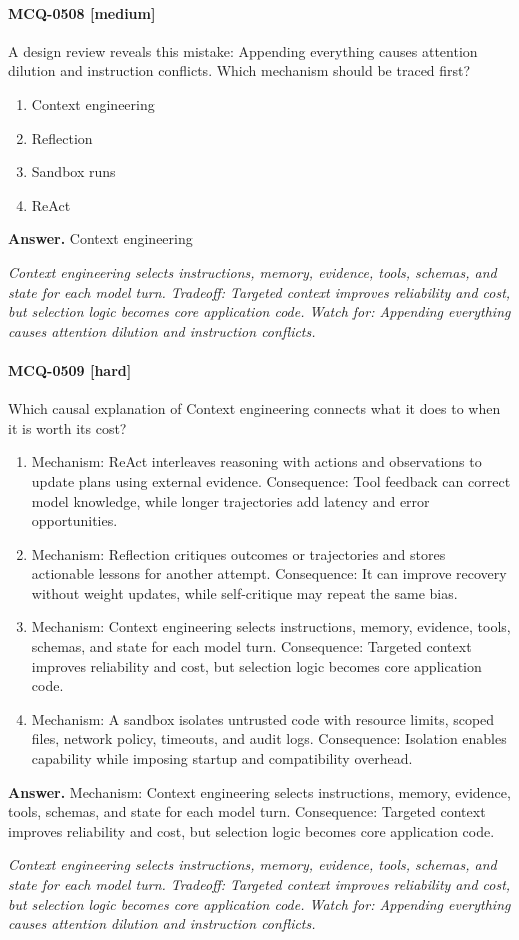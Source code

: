 \paragraph{MCQ-0508 [medium]} A design review reveals this mistake: Appending everything causes attention dilution and instruction conflicts. Which mechanism should be traced first?
\begin{enumerate}[label=\Alph*.]
\item Context engineering
\item Reflection
\item Sandbox runs
\item ReAct
\end{enumerate}
\noindent\textbf{Answer.} Context engineering
\par\textit{Context engineering selects instructions, memory, evidence, tools, schemas, and state for each model turn. Tradeoff: Targeted context improves reliability and cost, but selection logic becomes core application code. Watch for: Appending everything causes attention dilution and instruction conflicts.}
\paragraph{MCQ-0509 [hard]} Which causal explanation of Context engineering connects what it does to when it is worth its cost?
\begin{enumerate}[label=\Alph*.]
\item Mechanism: ReAct interleaves reasoning with actions and observations to update plans using external evidence. Consequence: Tool feedback can correct model knowledge, while longer trajectories add latency and error opportunities.
\item Mechanism: Reflection critiques outcomes or trajectories and stores actionable lessons for another attempt. Consequence: It can improve recovery without weight updates, while self-critique may repeat the same bias.
\item Mechanism: Context engineering selects instructions, memory, evidence, tools, schemas, and state for each model turn. Consequence: Targeted context improves reliability and cost, but selection logic becomes core application code.
\item Mechanism: A sandbox isolates untrusted code with resource limits, scoped files, network policy, timeouts, and audit logs. Consequence: Isolation enables capability while imposing startup and compatibility overhead.
\end{enumerate}
\noindent\textbf{Answer.} Mechanism: Context engineering selects instructions, memory, evidence, tools, schemas, and state for each model turn. Consequence: Targeted context improves reliability and cost, but selection logic becomes core application code.
\par\textit{Context engineering selects instructions, memory, evidence, tools, schemas, and state for each model turn. Tradeoff: Targeted context improves reliability and cost, but selection logic becomes core application code. Watch for: Appending everything causes attention dilution and instruction conflicts.}
